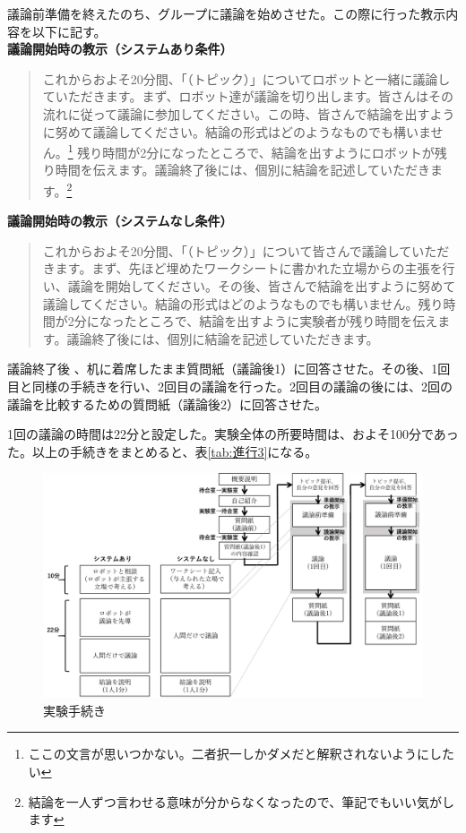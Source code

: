 \documentclass[11pt, a4paper]{jreport} %
\begin{document}
議論前準備を終えたのち、グループに議論を始めさせた。この際に行った教示内容を以下に記す。\\
\textbf{議論開始時の教示（システムあり条件）}
\begin{quote}
これからおよそ20分間、「（トピック）」についてロボットと一緒に議論していただきます。まず、ロボット達が議論を切り出します。皆さんはその流れに従って議論に参加してください。この時、皆さんで結論を出すように努めて議論してください。結論の形式はどのようなものでも構いません。\footnote{ここの文言が思いつかない。二者択一しかダメだと解釈されないようにしたい}
残り時間が2分になったところで、結論を出すようにロボットが残り時間を伝えます。議論終了後には、個別に結論を記述していただきます。\footnote{結論を一人ずつ言わせる意味が分からなくなったので、筆記でもいい気がします}%
\end{quote}

\textbf{議論開始時の教示（システムなし条件）}
\begin{quote}
これからおよそ20分間、「（トピック）」について皆さんで議論していただきます。まず、先ほど埋めたワークシートに書かれた立場からの主張を行い、議論を開始してください。その後、皆さんで結論を出すように努めて議論してください。結論の形式はどのようなものでも構いません。残り時間が2分になったところで、結論を出すように実験者が残り時間を伝えます。議論終了後には、個別に結論を記述していただきます。%
\end{quote}



議論終了後%
、机に着席したまま質問紙（議論後1）に回答させた。その後、1回目と同様の手続きを行い、2回目の議論を行った。2回目の議論の後には、2回の議論を比較するための質問紙（議論後2）に回答させた。


1回の議論の時間は22分と設定した。実験全体の所要時間は、およそ100分であった。以上の手続きをまとめると、表\ref{tab:進行3}になる。


\begin{figure}[htbp]
\begin{center}
\includegraphics[width=150mm]{images/実験手続き.png}
\caption{実験手続き}
\label{fig:進行3}
\end{center}
\end{figure}
\end{document}
